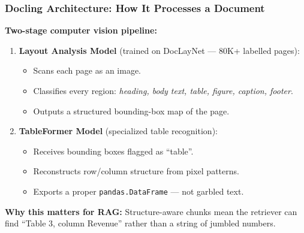 \begin{frame}[fragile]\frametitle{Docling Architecture: How It Processes a Document}

\textbf{Two-stage computer vision pipeline:}

\begin{enumerate}
  \item \textbf{Layout Analysis Model} (trained on DocLayNet --- 80K+ labelled pages):
  \begin{itemize}
    \item Scans each page as an image.
    \item Classifies every region: \textit{heading, body text, table, figure, caption, footer}.
    \item Outputs a structured bounding-box map of the page.
  \end{itemize}

  \item \textbf{TableFormer Model} (specialized table recognition):
  \begin{itemize}
    \item Receives bounding boxes flagged as ``table''.
    \item Reconstructs row/column structure from pixel patterns.
    \item Exports a proper \texttt{pandas.DataFrame} --- not garbled text.
  \end{itemize}
\end{enumerate}

\vspace{0.3em}
\textbf{Why this matters for RAG:} Structure-aware chunks mean the retriever can find ``Table 3, column Revenue'' rather than a string of jumbled numbers.

\end{frame}



